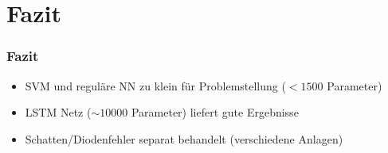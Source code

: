 \documentclass[utf8x, xcolor=dvipsnames]{beamer}
\begin{document}
\section{Fazit}

\begin{frame}
\frametitle{Fazit}
\begin{itemize}
	\item SVM und reguläre NN zu klein für Problemstellung ($<1500$ Parameter)\newline
	\item LSTM Netz ($\sim 10000$ Parameter) liefert gute Ergebnisse\newline
	\item Schatten/Diodenfehler separat behandelt (verschiedene Anlagen)
\end{itemize}
\end{frame}


\end{document}
